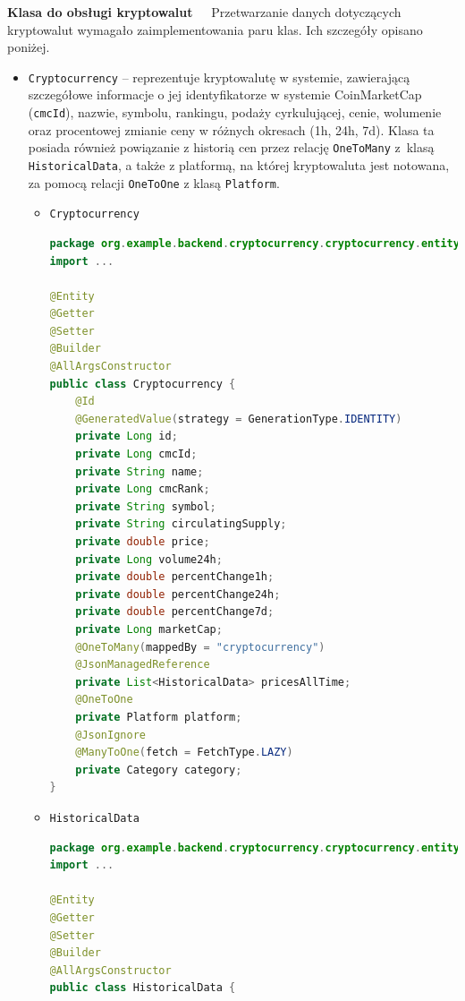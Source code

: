 \noindent \textbf{Klasa do obsługi kryptowalut~~}
Przetwarzanie danych dotyczących kryptowalut wymagało zaimplementowania paru klas. Ich szczegóły opisano poniżej.
\begin{itemize}
	\item \texttt{Cryptocurrency} -- reprezentuje kryptowalutę w systemie, zawierającą szczegółowe informacje o jej identyfikatorze w systemie CoinMarketCap (\texttt{cmcId}), nazwie, symbolu, rankingu, podaży cyrkulującej, cenie, wolumenie oraz procentowej zmianie ceny w różnych okresach (1h, 24h, 7d). Klasa ta posiada również powiązanie z historią cen przez relację \texttt{OneToMany} z~klasą \texttt{HistoricalData}, a także z platformą, na której kryptowaluta jest notowana, za pomocą relacji \texttt{OneToOne} z klasą \texttt{Platform}.
\begin{itemize}
\item \texttt{Cryptocurrency}
\begin{lstlisting}[language=Java, style=JavaStyle]
package org.example.backend.cryptocurrency.cryptocurrency.entity.currency;
import ...

@Entity
@Getter
@Setter
@Builder
@AllArgsConstructor
public class Cryptocurrency {
	@Id
	@GeneratedValue(strategy = GenerationType.IDENTITY)
	private Long id;
	private Long cmcId;
	private String name;
	private Long cmcRank;
	private String symbol;
	private String circulatingSupply;
	private double price;
	private Long volume24h;
	private double percentChange1h;
	private double percentChange24h;
	private double percentChange7d;
	private Long marketCap;
	@OneToMany(mappedBy = "cryptocurrency")
	@JsonManagedReference
	private List<HistoricalData> pricesAllTime;
	@OneToOne
	private Platform platform;
	@JsonIgnore
	@ManyToOne(fetch = FetchType.LAZY)
	private Category category;
}
\end{lstlisting}
\item \texttt{HistoricalData}
\begin{lstlisting}[language=Java, style=JavaStyle]
package org.example.backend.cryptocurrency.cryptocurrency.entity.historicalData;
import ...

@Entity
@Getter
@Setter
@Builder
@AllArgsConstructor
public class HistoricalData {


\end{lstlisting}
\end{itemize}
\end{itemize}
